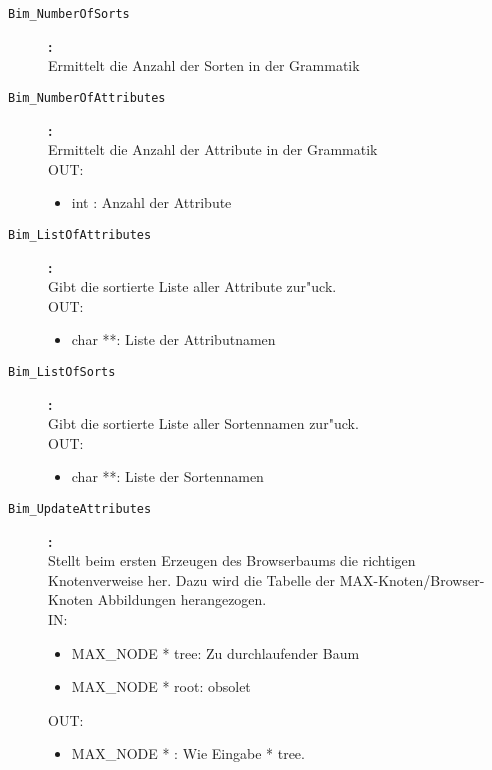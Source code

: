\begin{description}
\begin{itemize}
\end{itemize}
\item[\tt Bim\_NumberOfSorts
]{\bf :\\}
Ermittelt die Anzahl der Sorten in der Grammatik
  \\
\item[\tt Bim\_NumberOfAttributes
]{\bf :\\}
Ermittelt die Anzahl der Attribute in der Grammatik
  \\
OUT:
\begin{itemize}
   \item int : Anzahl der Attribute

\end{itemize}

\item[\tt Bim\_ListOfAttributes
]{\bf :\\}
Gibt die sortierte Liste aller Attribute zur"uck.
  \\
OUT:
\begin{itemize}
   \item char **: Liste der Attributnamen

\end{itemize}

\item[\tt Bim\_ListOfSorts
]{\bf :\\}
Gibt die sortierte Liste aller Sortennamen zur"uck.
  \\
OUT:
\begin{itemize}
   \item char **: Liste der Sortennamen

\end{itemize}

\item[\tt Bim\_UpdateAttributes
]{\bf :\\}
Stellt beim ersten Erzeugen des Browserbaums die richtigen
 Knotenverweise her. Dazu wird die Tabelle der MAX-Knoten/Browser-Knoten
 Abbildungen herangezogen.
  \\
IN:
\begin{itemize}
   \item MAX\_NODE * tree: Zu durchlaufender Baum
\item MAX\_NODE * root: obsolet

\end{itemize}
OUT:
\begin{itemize}
   \item MAX\_NODE * : Wie Eingabe * tree.

\end{itemize}


\end{description}
